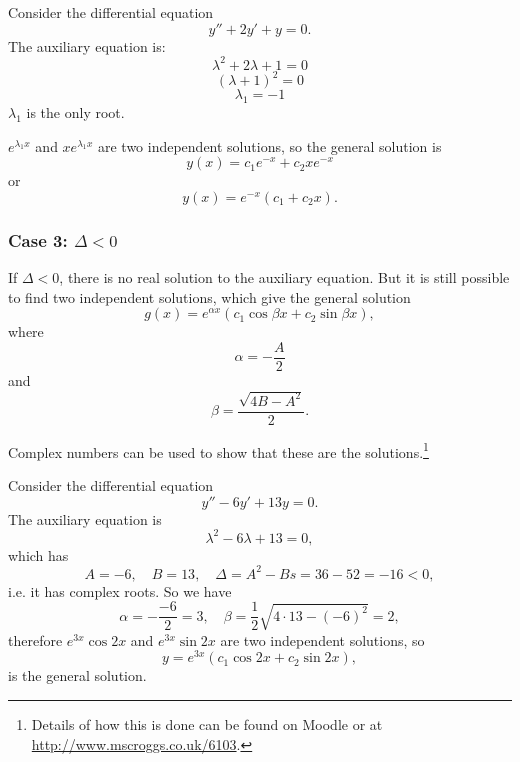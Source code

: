 \begin{example}
Consider the differential equation
\[y''+2y'+y=0.\]
The auxiliary equation is:
\[\lambda^2+2\lambda+1=0\]\[(\lambda+1)^2=0\]\[\lambda_1=-1\]
$\lambda_1$ is the only root.

$e^{\lambda_1x}$ and $xe^{\lambda_1x}$ are two independent solutions, so the general solution is
\[y(x)=c_1e^{-x}+c_2xe^{-x}\] or \[y(x)=e^{-x}(c_1+c_2x).\]
\end{example}

\subsubsection{Case 3: $\Delta<0$}
If $\Delta<0$, there is no real solution to the auxiliary equation.
But it is still possible to find two independent solutions, which give the general solution
\[g(x)=e^{\alpha x}\left( c_1\cos \beta x + c_2\sin \beta x \right),\]
where \[\alpha=-\frac{A}{2}\] and \[\beta=\frac{\sqrt{4B-A^2}}{2}.\]

Complex numbers can be used to show that these are the solutions.\footnote{Details of how this is done can be found on Moodle or at \url{http://www.mscroggs.co.uk/6103}.}

\begin{example}
Consider the differential equation
\[y''-6y'+13y=0.\]
The auxiliary equation is
\[\lambda^2-6\lambda +13=0,\]
which has 
\[A=-6,\quad B=13,\quad \Delta=A^2-Bs=36-52=-16<0,\]
i.e. it has complex roots. So we have
\[\alpha=-\frac{-6}{2}=3,\quad \beta=\frac{1}{2}\sqrt{4\cdot13-(-6)^2}=2,\]
therefore $e^{3x}\cos 2x$ and $e^{3x}\sin 2x$ are two independent solutions, so
\[y=e^{3x}(c_1\cos 2x + c_2\sin 2x),\]
is the general solution.
\end{example}
